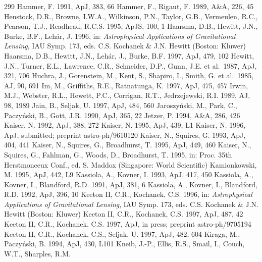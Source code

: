 \documentclass[a4paper,10pt]{article} %
\begin{document}
\begin{thebibliography}{299}
  Hammer, F. 1991, ApJ, 383, 66
  Hammer, F., Rigaut, F. 1989, A\&A, 226, 45
  Henstock, D.R., Browne, I.W.A., Wilkinson, P.N., Taylor, G.B.,
  Vermeulen, R.C., Pearson, T.J., Readhead, R.C.S. 1995, ApJS, 100, 1
  Haarsma, D.B., Hewitt, J.N., Burke, B.F., Leh\'ar, J. 1996, in: {\em
  Astrophysical Applications of Gravitational Lensing\/}, IAU
  Symp. 173, eds. C.S. Kochanek \& J.N. Hewitt (Boston: Kluwer)
  Haarsma, D.B., Hewitt, J.N., Leh\'ar, J., Burke, B.F. 1997, ApJ,
  479, 102
  Hewitt, J.N., Turner, E.L., Lawrence, C.R., Schneider, D.P., Gunn,
  J.E. et al.\ 1987, ApJ, 321, 706
  Huchra, J., Gorenstein, M., Kent, S., Shapiro, I., Smith, G. et
  al.\ 1985, AJ, 90, 691
  Im, M., Griffiths, R.E., Ratnatunga, K. 1997, ApJ, 475, 457
  Irwin, M.J., Webster, R.L., Hewett, P.C., Corrigan, R.T.,
  Jedrzejewski, R.I. 1989, AJ, 98, 1989
  Jain, B., Seljak, U. 1997, ApJ, 484, 560
  Jaroszy\'nski, M., Park, C., Paczy\'nski, B., Gott, J.R. 1990, ApJ,
  365, 22
  Jetzer, P. 1994, A\&A, 286, 426
  Kaiser, N. 1992, ApJ, 388, 272
  Kaiser, N. 1995, ApJ, 439, L1
  Kaiser, N. 1996, ApJ, submitted; preprint astro-ph/9610120
  Kaiser, N., Squires, G. 1993, ApJ, 404, 441
  Kaiser, N., Squires, G., Broadhurst, T. 1995, ApJ, 449, 460
  Kaiser, N., Squires, G., Fahlman, G., Woods, D., Broadhurst,
  T. 1995, in: Proc. 35th Herstmonceux Conf., ed. S. Maddox
  (Singapore: World Scientific)
  Kamionkowski, M. 1995, ApJ, 442, L9
  Kassiola, A., Kovner, I. 1993, ApJ, 417, 450
  Kassiola, A., Kovner, I., Blandford, R.D. 1991, ApJ, 381, 6
  Kassiola, A., Kovner, I., Blandford, R.D. 1992, ApJ, 396, 10
  Keeton II, C.R., Kochanek, C.S. 1996, in: {\em Astrophysical
  Applications of Gravitational Lensing\/}, IAU Symp. 173,
  eds. C.S. Kochanek \& J.N. Hewitt (Boston: Kluwer)
  Keeton II, C.R., Kochanek, C.S. 1997, ApJ, 487, 42
  Keeton II, C.R., Kochanek, C.S. 1997, ApJ, in press; preprint
  astro-ph/9705194
  Keeton II, C.R., Kochanek, C.S., Seljak, U. 1997, ApJ, 482, 604
  Kiraga, M., Paczy\'nski, B. 1994, ApJ, 430, L101
  Kneib, J.-P., Ellis, R.S., Smail, I., Couch, W.T., Sharples, R.M.

\end{thebibliography}
\end{document}
